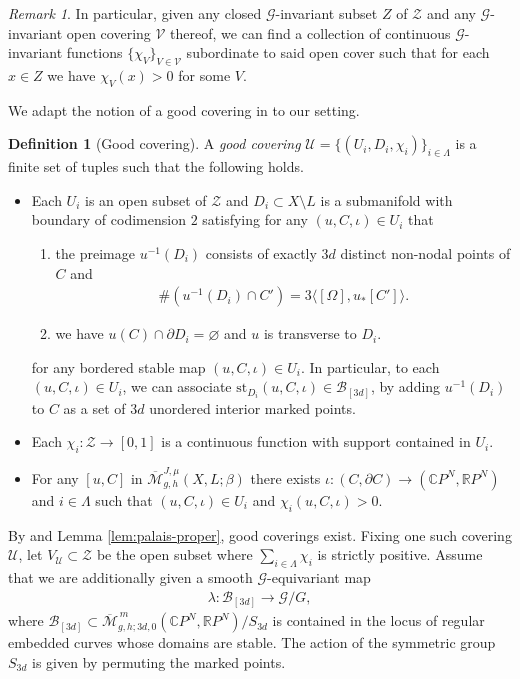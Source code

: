\documentclass[11pt,psamsfonts, oneside, reqno]{amsart}
\newcommand{\sub}{\subset}%
\newcommand{\sm}{\ensuremath{\setminus}}%
\newcommand{\cl}{\colon}
\newcommand{\Mbar}{\overline{\mathcal M}}
\newcommand{\del}{\partial}
\newcommand{\bC}{\mathbb{C}}
\newcommand{\bR}{\mathbb{R}}
\newcommand{\cB}{\mathcal{B}}
\newcommand{\cG}{\mathcal{G}}
\newcommand{\cU}{\mathcal{U}}
\newcommand{\cV}{\mathcal{V}}
\newcommand{\cZ}{\mathcal{Z}}
\theoremstyle{definition}
\newtheorem{definition}[theorem]{Definition}
\theoremstyle{remark}
\newtheorem{remark}[theorem]{Remark}
\numberwithin{equation}{section}
\begin{document}
\begin{remark}\label{rem:partition-of-almost-unity}In particular, given any closed $\cG$-invariant subset $Z$ of $\cZ$ and any $\cG$-invariant open covering $\cV$ thereof, we can find a collection of continuous $\cG$-invariant functions $\{\chi_V\}_{V\in \cV}$ subordinate to said open cover such that for each $x\in Z$ we have $\chi_V(x) > 0$ for some $V$.
\end{remark}

\noindent
We adapt the notion of a good covering in \cite[Definition~3.10]{HS22} to our setting.

\begin{definition}[Good covering]\label{good-covering}
	A \emph{good covering}	$\cU=\{(U_i,D_i,\chi_i)\}_{i\in\Lambda}$ is a finite set of tuples such that the following holds.
	\begin{itemize}[leftmargin=20pt]
		\item\label{stabilizing-divisor} Each $U_i$ is an open subset of $\cZ$ and $D_i\sub X\sm L$ is a submanifold with boundary of codimension $2$ satisfying for any $(u,C,\iota)\in U_i$ that
		\begin{enumerate}[\normalfont (i)]
			\item\label{transverse-marking} the preimage $u^{-1}(D_i)$ consists of exactly $3d$ distinct non-nodal points of $C$ and
			\begin{align*}
				\#(u^{-1}(D_i)\cap C') = 3\langle [\Omega],u_*[C']\rangle.
			\end{align*}
			\item\label{avoid-boundary} we have $u(C)\cap\partial D_i=\varnothing$ and $u$ is transverse to $D_i$.
		\end{enumerate}
		for any bordered stable map $(u,C,\iota)\in U_i$. In particular, to each $(u,C,\iota)\in U_i$, we can associate $\text{st}_{D_i}(u,C,\iota)\in\cB_{[3d]}$, by adding $u^{-1}(D_i)$ to $C$ as a set of $3d$ unordered interior marked points.
		\item Each $\chi_i:\cZ\to[0,1]$ is a continuous function with support contained in $U_i$. 
		\item For any $[u,C]$ in $\Mbar_{g,h}^{J,\mu}(X,L;\beta)$ there exists $\iota \cl (C,\del C)\to (\bC P^N,\bR P^N)$ and $i\in\Lambda$ such that $(u,C,\iota)\in U_i$ and $\chi_i(u,C,\iota)>0$.
\end{itemize}\end{definition}

\noindent
By \cite[Lemma 9.4.3]{P16} and Lemma \ref{lem:palais-proper}, good coverings exist. Fixing one such covering $\cU$, let $V_\cU\subset \cZ$ be the open subset where $\sum_{i\in \Lambda}\chi_i$ is strictly positive. Assume that we are additionally given a smooth $\cG$-equivariant map
\begin{align*}
	\lambda:\cB_{[3d]}\to\cG/G,
\end{align*}
where $\cB_{[3d]}\sub \Mbar_{g,h;3d,0}^{\,m}(\bC P^N,\bR P^N)/S_{3d}$ is contained in the locus of regular embedded curves whose domains are stable. The action of the symmetric group $S_{3d} $ is given by permuting the marked points.
\end{document}
